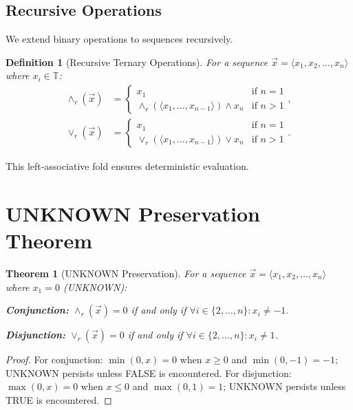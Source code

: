 \documentclass[11pt,a4paper]{article}
\newtheorem{theorem}{Theorem}
\newtheorem{definition}{Definition}
\begin{document}
\subsection{Recursive Operations}

We extend binary operations to sequences recursively.

\begin{definition}[Recursive Ternary Operations]
For a sequence $\vec{x} = \langle x_1, x_2, \ldots, x_n \rangle$ where $x_i \in \mathbb{T}$:
\begin{align}
    \land_r(\vec{x}) &=
    \begin{cases}
        x_1 & \text{if } n = 1 \\
        \land_r(\langle x_1, \ldots, x_{n-1} \rangle) \land x_n & \text{if } n > 1
    \end{cases}, \\
    \lor_r(\vec{x}) &=
    \begin{cases}
        x_1 & \text{if } n = 1 \\
        \lor_r(\langle x_1, \ldots, x_{n-1} \rangle) \lor x_n & \text{if } n > 1
    \end{cases}.
\end{align}
\end{definition}

This left-associative fold ensures deterministic evaluation.

\section{UNKNOWN Preservation Theorem}

\begin{theorem}[UNKNOWN Preservation]
For a sequence $\vec{x} = \langle x_1, x_2, \ldots, x_n \rangle$ where $x_1 = 0$ (UNKNOWN):

\textbf{Conjunction:} $\land_r(\vec{x}) = 0$ if and only if $\forall i \in \{2, \ldots, n\}: x_i \neq -1$.

\textbf{Disjunction:} $\lor_r(\vec{x}) = 0$ if and only if $\forall i \in \{2, \ldots, n\}: x_i \neq 1$.
\end{theorem}

\begin{proof}
For conjunction: $\min(0, x) = 0$ when $x \geq 0$ and $\min(0, -1) = -1$; UNKNOWN persists unless FALSE is encountered. For disjunction: $\max(0, x) = 0$ when $x \leq 0$ and $\max(0, 1) = 1$; UNKNOWN persists unless TRUE is encountered.
\end{proof}
\end{document}

